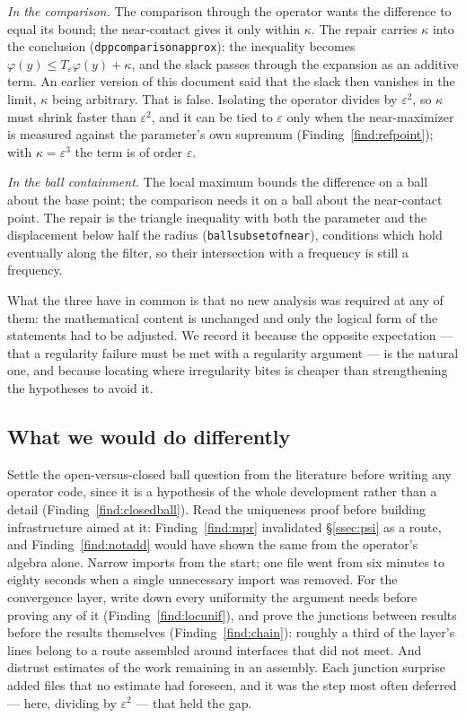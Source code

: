\documentclass[11pt,reqno]{amsart}
\newcommand{\LEANREF}[1]{\texttt{\small\def\_{\textunderscore\allowbreak}#1}}
\newcommand{\eps}{\varepsilon}
\newcommand{\Op}{T_\eps}
\theoremstyle{plain}
\theoremstyle{definition}
\begin{document}
\emph{In the comparison.} The comparison through the operator wants the
difference to equal its bound; the near-contact gives it only within $\kappa$.
The repair carries $\kappa$ into the conclusion
(\LEANREF{dpp\_comparison\_approx}): the inequality becomes
$\varphi(y) \le \Op\varphi(y) + \kappa$, and the slack passes through the
expansion as an additive term. An earlier version of this document said that the
slack then vanishes in the limit, $\kappa$ being arbitrary. That is false.
Isolating the operator divides by $\eps^2$, so $\kappa$ must shrink faster than
$\eps^2$, and it can be tied to $\eps$ only when the near-maximizer is measured
against the parameter's own supremum (Finding~\ref{find:refpoint}); with
$\kappa = \eps^3$ the term is of order $\eps$.

\emph{In the ball containment.} The local maximum bounds the difference on a
ball about the base point; the comparison needs it on a ball about the
near-contact point. The repair is the triangle inequality with both the
parameter and the displacement below half the radius
(\LEANREF{ball\_subset\_of\_near}), conditions which hold eventually along the
filter, so their intersection with a frequency is still a frequency.

What the three have in common is that no new analysis was required at any of
them: the mathematical content is unchanged and only the logical form of the
statements had to be adjusted. We record it because the opposite expectation
--- that a regularity failure must be met with a regularity argument --- is the
natural one, and because locating where irregularity bites is cheaper than
strengthening the hypotheses to avoid it.

\subsection{What we would do differently}

Settle the open-versus-closed ball question from the literature before writing
any operator code, since it is a hypothesis of the whole development rather
than a detail (Finding~\ref{find:closedball}). Read the uniqueness proof before
building infrastructure aimed at it: Finding~\ref{find:mpr} invalidated
\S\ref{ssec:psi} as a route, and Finding~\ref{find:notadd} would have shown the
same from the operator's algebra alone. Narrow imports from the start; one file
went from six minutes to eighty seconds when a single unnecessary import was
removed. For the convergence layer, write down every uniformity the argument
needs before proving any of it (Finding~\ref{find:locunif}), and prove the
junctions between results before the results themselves
(Finding~\ref{find:chain}): roughly a third of the layer's lines belong to a
route assembled around interfaces that did not meet. And distrust estimates of
the work remaining in an assembly. Each junction surprise added files that no
estimate had foreseen, and it was the step most often deferred --- here,
dividing by $\eps^2$ --- that held the gap.
\end{document}
